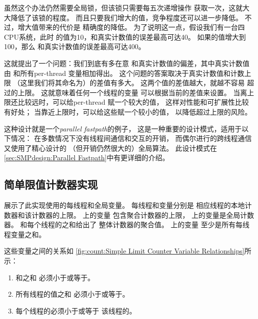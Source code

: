 虽然这个办法仍然需要全局锁，但该锁只需要每五次递增操作
获取一次，这就大大降低了该锁的程度。
而且只要我们增大的值，竞争程度还可以进一步降低。
不过，增大值带来的代价是
精确度的降低。
为了说明这一点，假设我们有一台四CPU系统，此时
的值为10，和真实计数值的误差最高可达40。
如果的值增大到100，那么
和真实计数值的误差最高可达400。

这就提出了一个问题：我们到底有多在意
和真实计数值的偏差，其中真实计数值由
和所有per-thread 变量相加得出。
这个问题的答案取决于真实计数值和计数上限
（这里我们将其命名为）的差值有多大。
这两个值的差值越大，就越不容易
超过的上限。
这就意味着任何一个线程的变量
可以根据当前的差值来设置。
当离上限还比较远时，可以给per-thread 赋一个较大的值，
这样对性能和可扩展性比较有好处；
当靠近上限时，可以给这些赋一个较小的值，
以降低超过上限的风险。

这种设计就是一个\emph{parallel fastpath}的例子，
这是一种重要的设计模式，适用于以下情况：
在多数情况下没有线程间通信和交互的开销，
而偶尔进行的跨线程通信又使用了精心设计的
（但开销仍然很大的）全局算法。
此设计模式在\cref{sec:SMPdesign:Parallel Fastpath}中有更详细的介绍。

\subsection{简单限值计数器实现}
\label{sec:count:Simple Limit Counter Implementation}

\begin{fcvref}
展示了此实现使用的每线程和全局变量。
每线程和变量分别是
相应线程的本地计数器和该计数器的上限。
上的变量
包含聚合计数器的上限，
上的变量是全局计数器。
和每个线程的之和给出了
整体计数器的聚合值。
上的变量
至少是所有每线程变量之和。
\end{fcvref}
这些变量之间的关系如
\cref{fig:count:Simple Limit Counter Variable Relationships}所示：
\begin{enumerate}
\item	{}和之和
	必须小于或等于。
\item	所有线程的值之和
	必须小于或等于。
\item	每个线程的必须小于或等于
	该线程的。
\end{enumerate}

